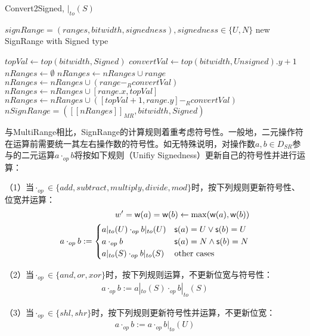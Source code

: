 \begin{breakablealgorithm}
	\caption{Convert2Signed, $ |_{to}(S) $}
	\label{alg:toSigned}
	\begin{algorithmic}[1]
		
		\Require $ signRange = (ranges, bitwidth, signedness) , signedness \in \{U, N\}$
		\Ensure new SignRange with Signed type
		
		\State $ topVal \gets top(bitwidth, Signed) $
		\State $ convertVal \gets top(bitwidth, Unsigned).y + 1 $
		\State $ nRanges \gets \emptyset $
				\State $ nRanges \gets nRanges \cup range $
				\State $ nRanges \gets nRanges \cup (range -_R convertVal) $
			\Else
				\State $ nRanges \gets nRanges \cup [range.x, topVal] $
				\State $ nRanges \gets nRanges \cup ([topVal + 1, range.y] -_R convertVal) $
			\EndIf
		\EndFor
		\\\Return $ nSignRange = ([[nRanges]]_{MR}, bitwidth, Signed) $
	\end{algorithmic}
\end{breakablealgorithm}

与MultiRange相比，SignRange的计算规则着重考虑符号性。一般地，二元操作符在运算前需要统一其左右操作数的符号性。如无特殊说明，对操作数$ a, b \in D_{SR}$参与的二元运算$ a \cdot_{op} b $将按如下规则（Unifiy Signedness）更新自己的符号性并进行运算：

（1）当$ \cdot_{op} \in \{add, subtract, multiply, divide, mod\} $时，按下列规则更新符号性、位宽并运算：
\begin{align}{\label{align:Unify规则}}
	w' = \mathsf{w}(a) = \mathsf{w}(b) \gets \max(\mathsf{w}(a), \mathsf{w}(b)) \\
	a \cdot_{op} b := \begin{cases}
		a |_{to}(U) \cdot_{op} b |_{to}(U) & \mathsf{s}(a) = U \lor \mathsf{s}(b) = U\\
		a \cdot_{op} b & \mathsf{s}(a) = N \land \mathsf{s}(b) = N\\
		a |_{to}(S) \cdot_{op} b |_{to}(S) & \text{other cases}
	\end{cases}
\end{align}

（2）当$ \cdot_{op} \in \{and, or, xor\} $时，按下列规则运算，不更新位宽与符号性：
\begin{align}
	a \cdot_{op} b := a |_{to}(S) \cdot_{op} b |_{to}(S)
\end{align}

（3）当$ \cdot_{op} \in \{shl, shr\} $时，按下列规则更新符号性并运算，不更新位宽：
\begin{align}
	a \cdot_{op} b := a \cdot_{op} b |_{to}(U)
\end{align}

